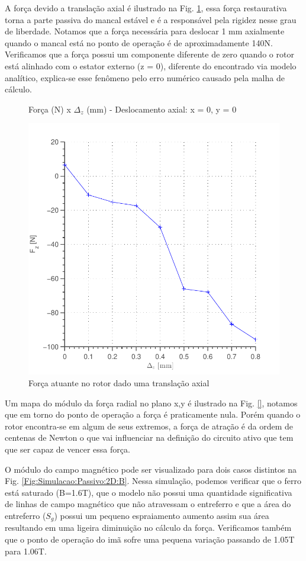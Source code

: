 A força devido a translação axial é ilustrado na Fig. \ref{fig:forca:passivo:otimizado:fem:dy}, essa força restaurativa torna a parte passiva do mancal estável e é a responsável pela rigidez nesse grau de liberdade. Notamos que a força necessária para deslocar 1 mm axialmente quando o mancal está no ponto de operação é de aproximadamente 140N. Verificamos que a força possui um componente diferente de zero quando o rotor está alinhado com o estator externo (z = 0), diferente do encontrado via  modelo analítico, explica-se esse fenômeno pelo erro numérico causado pela malha de cálculo.


\begin{figure}[!ht]
	\centering
	\caption*{Força (N) x $\Delta_z$ (mm) - Deslocamento axial: x = 0, y = 0}
	\includegraphics[width=0.6 \columnwidth,angle=0]{Figs/Simulacoes/Passivo2/fem/passivo_otimizado_fem_dy}
	\caption{Força atuante no rotor dado uma translação axial}
	\label{fig:forca:passivo:otimizado:fem:dy}
\end{figure}

Um mapa do módulo da força radial no plano x,y é ilustrado na Fig. \ref{}, notamos que em torno do ponto de operação a força é praticamente nula. Porém quando o rotor encontra-se em algum de seus extremos, a força de atração é da ordem de centenas de Newton o que vai influenciar na definição do circuito ativo que tem que ser capaz de vencer essa força.

O módulo do campo magnético pode ser visualizado para dois casos distintos na Fig. \ref{Fig:Simulacao:Passivo:2D:B}. Nessa simulação, podemos verificar que o ferro está saturado (B=1.6T), que o modelo não possui uma quantidade significativa de linhas de campo magnético que não atravessam o entreferro e que a área do entreferro ($S_g$) possui um pequeno espraiamento aumento assim sua área resultando em uma ligeira diminuição no cálculo da força. Verificamos também que o ponto de operação do imã sofre uma pequena variação passando de 1.05T para 1.06T.

